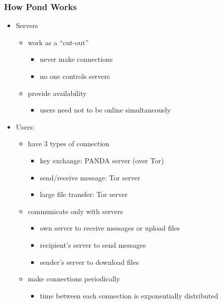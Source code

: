 \begin{frame}
	\frametitle{How Pond Works}

	\begin{itemize}
	\item	Servers
		\begin{itemize}
		\item	work as a ``cut-out''
			\begin{itemize}
			\item	never make connections
			\item	no one controls servers
			\end{itemize}
		\item	provide availability
			\begin{itemize}
			\item	users need not to be online simultaneously
			\end{itemize}
		\end{itemize}

	\pause
	\item	Users:
		\begin{itemize}
		\item	have 3 types of connection
			\begin{itemize}
			\item	key exchange: PANDA server (over Tor)
			\item	send/receive message: Tor server
			\item	large file transfer: Tor server
			\end{itemize}
		\item	communicate only with servers
			\begin{itemize}
			\item	own server to receive messages or upload files
			\item	recipient's server to send messages
			\item	sender's server to download files
			\end{itemize}
		\item	make connections periodically
			\begin{itemize}
			\item	time between each connection is exponentially distributed
			\end{itemize}
		\end{itemize}
	\end{itemize}
\end{frame}

